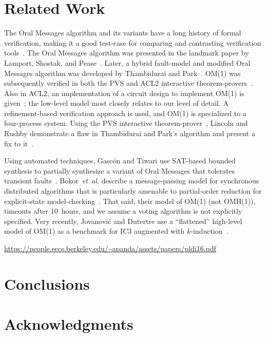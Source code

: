 \documentclass{llncs/llncs}
\newcommand{\lee}[1]{ } %
\newcommand{\lee}[1]{ {\color{blue}$<$lee: #1$>$} } %
\begin{document}
\section{Related Work}\label{sec:related}

The Oral Messages algorithm and its variants have a long history of formal verification, making it a good test-case for comparing and contrasting verification tools~\cite{pvs}. The Oral Messages algorithm was presented in the landmark paper by Lamport, Shostak, and Pease~\cite{om}. Later, a hybrid fault-model and modified Oral Messages algorithm was developed by Thambidurai and Park~\cite{hybrid}. OM(1) was subsequently verified in both the PVS and ACL2 interactive theorem-provers~\cite{Young97:IC}. Also in ACL2, an implementation of a circuit design to implement OM(1) is given~\cite{om-acl2-impl}; the low-level model most closely relates to our level of detail. A refinement-based verification approach is used, and OM(1) is specialized to a four-process system. Using the PVS interactive theorem-prover~\cite{pvs}, Lincoln and Rushby demonstrate a flaw in Thambidurai and Park's algorithm and present a fix to it~\cite{csl-93-2}.

Using automated techniques, Gasc{\'{o}}n and Tiwari use SAT-based bounded synthesis to partially synthesize a variant of Oral Messages that tolerates transient faults~\cite{om1-synth}. Bokor~\emph{et~al.} describe a message-passing model for synchronous distributed algorithms that is particularly amenable to partial-order reduction for explicit-state model-checking~\cite{Bokor2010}. That said, their model of OM(1) (not OMH(1)), timeouts after 10~hours, and we assume a voting algorithm is not explicitly specified. Very recently, Jovanovi{\'{c}} and Dutertre use a ``flattened'' high-level model of OM(1) as a benchmark for IC3 augmented with $k$-induction~\cite{pdr-kind}.

\url{https://people.eecs.berkeley.edu/~apanda/assets/papers/pldi16.pdf}

\lee{mention that ASMs similar to disjunction invariants}

\section{Conclusions}\label{sec:conclusions}

\lee{talk about compositional verification of properties, even though SAL doesn't directly support it}
\lee{talk about k-induction vs. PDR}
\lee{talk about lack of axiomatization in model-checking (multiple rushby bugs), but  tradeoff of deadlock. see proglema paper}

\lee{talk about atom-sally}

\section*{Acknowledgments}
\lee{NASA contract, honeywell ppl, rushby's model?}



\end{document}
